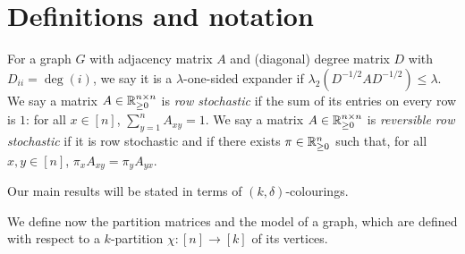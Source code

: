 \chapter{Definitions and notation}


For a graph $G$ with adjacency matrix $A$ and (diagonal) degree matrix $D$ with $D_{ii} = \deg(i)$, we say it is a $\lambda$-one-sided expander if $\lambda_2(D^{-1/2} A D^{-1/2}) \leq \lambda$.
We say a matrix $A \in {\mathbb R}_{\geq 0}^{n \times n}$ is \emph{row stochastic} if the sum of its entries on every row is $1$: for all $x \in [n]$, $\sum_{y=1}^n A_{xy} = 1$.
We say a matrix $A \in {\mathbb R}_{\geq 0}^{n \times n}$ is \emph{reversible row stochastic} if it is row stochastic and if there exists $\pi \in {\mathbb R}_{\geq 0}^{n}$ such that, for all $x, y \in [n]$, $\pi_x A_{xy} = \pi_y A_{yx}$.

Our main results will be stated in terms of $(k,\delta)$-colourings.


We define now the partition matrices and the model of a graph, which are defined with respect to a $k$-partition $\chi: [n] \to [k]$ of its vertices.



